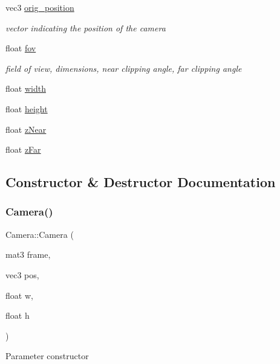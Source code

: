 \begin{DoxyCompactItemize}
vec3 \mbox{\hyperlink{classCamera_aca4635de7bd810e41e698c359777d4b6}{orig\+\_\+position}}
\begin{DoxyCompactList}\small\item\em vector indicating the position of the camera \end{DoxyCompactList}\item 
float \mbox{\hyperlink{classCamera_aff7393c9cfbccd7e369091f00008da93}{fov}}
\begin{DoxyCompactList}\small\item\em field of view, dimensions, near clipping angle, far clipping angle \end{DoxyCompactList}\item 
float \mbox{\hyperlink{classCamera_a6fd29b8dd0cff815956c30f310a9b610}{width}}
\item 
float \mbox{\hyperlink{classCamera_a956ccfce53f1bced41a82f6a4c6cd99a}{height}}
\item 
float \mbox{\hyperlink{classCamera_a1db2166635ff27594eda3a23130b66ac}{z\+Near}}
\item 
float \mbox{\hyperlink{classCamera_a6290469f972a5903c805725db563f41f}{z\+Far}}
\end{DoxyCompactItemize}


\subsection{Constructor \& Destructor Documentation}
\mbox{\label{classCamera_af50a1edab8d04a870747c6d52ad7e51e}} 
\subsubsection{\texorpdfstring{Camera()}{Camera()}\hspace{0.1cm}{\footnotesize\ttfamily [1/2]}}
{\footnotesize\ttfamily Camera\+::\+Camera (\begin{DoxyParamCaption}\item[{mat3}]{frame,  }\item[{vec3}]{pos,  }\item[{float}]{w,  }\item[{float}]{h }\end{DoxyParamCaption})}

Parameter constructor \mbox{\label{classCamera_a01f94c3543f56ede7af49dc778f19331}} 
